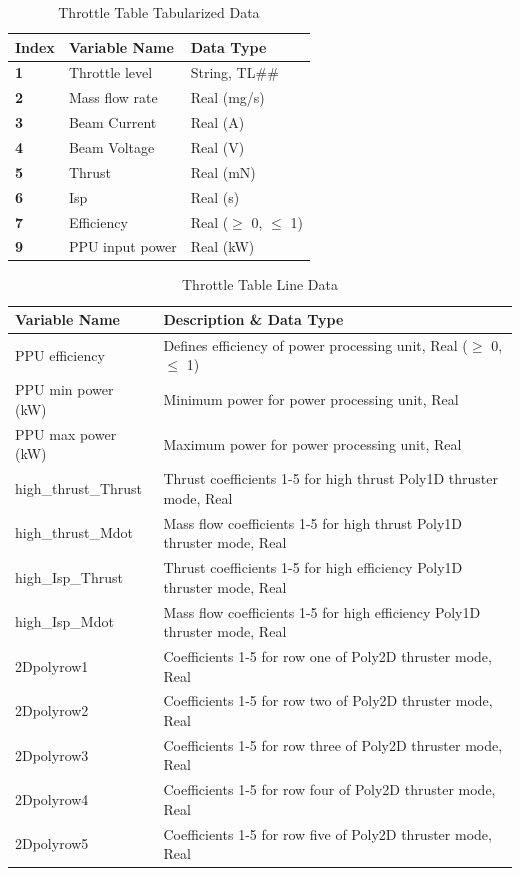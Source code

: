 \begin{table}[H]
    \centering
    \begin{tabular}{lll}
    \hline
    \textbf{Index} & \textbf{Variable Name} & \textbf{Data Type} \\
    \hline
    \textbf{1} & Throttle level & String, TL\#\# \\
    \textbf{2} & Mass flow rate & Real (mg/s) \\
    \textbf{3} & Beam Current & Real (A) \\
    \textbf{4} & Beam Voltage & Real (V) \\
    \textbf{5} & Thrust & Real (mN) \\
    \textbf{6} & Isp & Real (s) \\
    \textbf{7} & Efficiency & Real ($\geq$ 0, $\leq$ 1) \\
    \textbf{9} & PPU input power & Real (kW) \\
    \end{tabular}
    \caption{Throttle Table Tabularized Data}
    \label{tab:throttle_table_table}
\end{table}

\begin{table}[H]
    \centering
    \begin{tabular}{ll}
    \hline
    \textbf{Variable Name} & \textbf{Description \& Data Type}\\
    \hline
    PPU efficiency & Defines efficiency of power processing unit, Real ($\geq$ 0, $\leq$ 1) \\
    PPU min power (kW) & Minimum power for power processing unit, Real \\
    PPU max power (kW) & Maximum power for power processing unit, Real \\
    high\_thrust\_Thrust & Thrust coefficients 1-5 for high thrust Poly1D thruster mode, Real \\
    high\_thrust\_Mdot & Mass flow coefficients 1-5 for high thrust Poly1D thruster mode, Real \\
    high\_Isp\_Thrust & Thrust coefficients 1-5 for high efficiency Poly1D thruster mode, Real \\
    high\_Isp\_Mdot & Mass flow coefficients 1-5 for high efficiency Poly1D thruster mode, Real \\
    2Dpolyrow1 & Coefficients 1-5 for row one of Poly2D thruster mode, Real \\
    2Dpolyrow2 & Coefficients 1-5 for row two of Poly2D thruster mode, Real \\
    2Dpolyrow3 & Coefficients 1-5 for row three of Poly2D thruster mode, Real \\
    2Dpolyrow4 & Coefficients 1-5 for row four of Poly2D thruster mode, Real \\
    2Dpolyrow5 & Coefficients 1-5 for row five of Poly2D thruster mode, Real \\
    \end{tabular}
    \caption{Throttle Table Line Data}
    \label{tab:throttle_table_lines}
\end{table}

